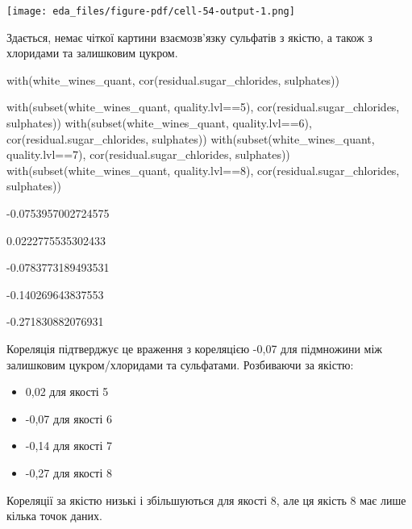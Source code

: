 \documentclass[
  letterpaper,
  DIV=11,
  numbers=noendperiod]{scrreprt}
\newenvironment{Shaded}{\begin{snugshade}}{\end{snugshade}}
\newcommand{\DecValTok}[1]{\textcolor[rgb]{0.68,0.00,0.00}{#1}}
\newcommand{\FunctionTok}[1]{\textcolor[rgb]{0.28,0.35,0.67}{#1}}
\newcommand{\NormalTok}[1]{\textcolor[rgb]{0.00,0.23,0.31}{#1}}
\newcommand{\SpecialCharTok}[1]{\textcolor[rgb]{0.37,0.37,0.37}{#1}}
\providecommand{\tightlist}{%
  \setlength{\itemsep}{0pt}\setlength{\parskip}{0pt}}\usepackage{longtable,booktabs,array}
\begin{document}
\texttt{[image: eda\_files/figure-pdf/cell-54-output-1.png]}

Здається, немає чіткої картини взаємозв'язку сульфатів з якістю, а також
з хлоридами та залишковим цукром.

\begin{Shaded}
\begin{Highlighting}[]
\FunctionTok{with}\NormalTok{(white\_wines\_quant, }\FunctionTok{cor}\NormalTok{(residual.sugar\_chlorides, sulphates))}

\FunctionTok{with}\NormalTok{(}\FunctionTok{subset}\NormalTok{(white\_wines\_quant, quality.lvl}\SpecialCharTok{==}\DecValTok{5}\NormalTok{),}
     \FunctionTok{cor}\NormalTok{(residual.sugar\_chlorides, sulphates))}
\FunctionTok{with}\NormalTok{(}\FunctionTok{subset}\NormalTok{(white\_wines\_quant, quality.lvl}\SpecialCharTok{==}\DecValTok{6}\NormalTok{),}
     \FunctionTok{cor}\NormalTok{(residual.sugar\_chlorides, sulphates))}
\FunctionTok{with}\NormalTok{(}\FunctionTok{subset}\NormalTok{(white\_wines\_quant, quality.lvl}\SpecialCharTok{==}\DecValTok{7}\NormalTok{),}
     \FunctionTok{cor}\NormalTok{(residual.sugar\_chlorides, sulphates))}
\FunctionTok{with}\NormalTok{(}\FunctionTok{subset}\NormalTok{(white\_wines\_quant, quality.lvl}\SpecialCharTok{==}\DecValTok{8}\NormalTok{),}
     \FunctionTok{cor}\NormalTok{(residual.sugar\_chlorides, sulphates))}
\end{Highlighting}
\end{Shaded}

-0.0753957002724575

0.0222775535302433

-0.0783773189493531

-0.140269643837553

-0.271830882076931

Кореляція підтверджує це враження з кореляцією -0,07 для підмножини між
залишковим цукром/хлоридами та сульфатами. Розбиваючи за якістю:

\begin{itemize}
\tightlist
\item
  0,02 для якості 5
\item
  -0,07 для якості 6
\item
  -0,14 для якості 7
\item
  -0,27 для якості 8
\end{itemize}

Кореляції за якістю низькі і збільшуються для якості 8, але ця якість 8
має лише кілька точок даних.
\end{document}
